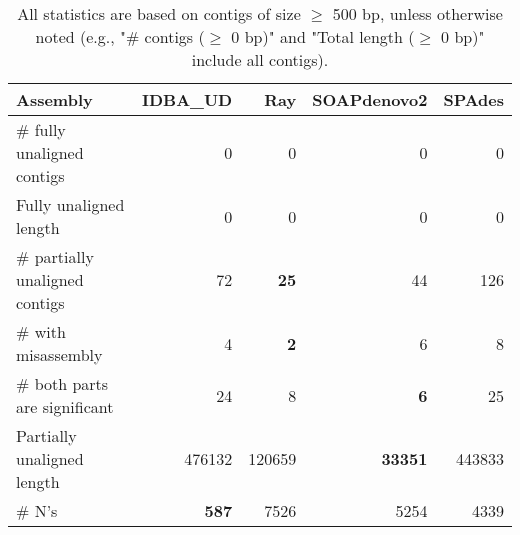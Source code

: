 \documentclass[12pt,a4paper]{article}
\begin{document}
\begin{table}[ht]
\begin{center}
\caption{All statistics are based on contigs of size $\geq$ 500 bp, unless otherwise noted (e.g., "\# contigs ($\geq$ 0 bp)" and "Total length ($\geq$ 0 bp)" include all contigs).}
\begin{tabular}{|l*{4}{|r}|}
\hline
Assembly & IDBA\_UD & Ray & SOAPdenovo2 & SPAdes \\ \hline
\# fully unaligned contigs & 0 & 0 & 0 & 0 \\ \hline
Fully unaligned length & 0 & 0 & 0 & 0 \\ \hline
\# partially unaligned contigs & 72 & {\bf 25} & 44 & 126 \\ \hline
\hspace{5mm}\# with misassembly & 4 & {\bf 2} & 6 & 8 \\ \hline
\hspace{5mm}\# both parts are significant & 24 & 8 & {\bf 6} & 25 \\ \hline
Partially unaligned length & 476132 & 120659 & {\bf 33351} & 443833 \\ \hline
\# N's & {\bf 587} & 7526 & 5254 & 4339 \\ \hline
\end{tabular}
\end{center}
\end{table}
\end{document}
